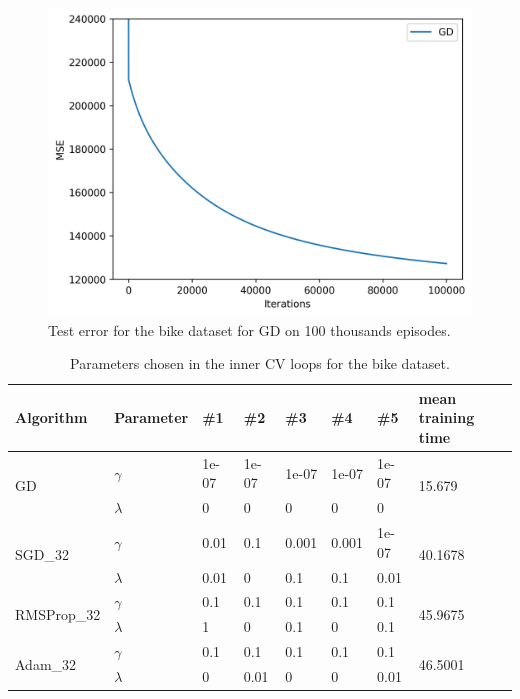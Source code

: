 \documentclass[10pt,conference,compsocconf]{IEEEtran}
\begin{document}
\begin{figure}[htbp]
	\centering
	\includegraphics[width=\columnwidth]{pictures/bike_test_GD_100k}
	\caption{Test error for the bike dataset for GD on 100 thousands episodes.}
	\vspace{-3mm}
	\label{fig:bike_test_GD_100k}
\end{figure}

\begin{table}[htbp]
	\centering
	\begin{tabular}[c]{llllllll}
		\hline
		Algorithm&Parameter&\#1&\#2&\#3&\#4&\#5&mean training time\\
		\hline
		\multirow{2}{*}{GD}&$\gamma$&1e-07&1e-07&1e-07&1e-07&1e-07&\multirow{2}{*}{15.679}\\
		&$\lambda$&0&0&0&0&0&\\
		
		\multirow{2}{*}{SGD\_32}&$\gamma$&0.01&0.1&0.001&0.001&1e-07&\multirow{2}{*}{40.1678}\\
		&$\lambda$&0.01&0&0.1&0.1&0.01&\\
		
		\multirow{2}{*}{RMSProp\_32}&$\gamma$&0.1&0.1&0.1&0.1&0.1&\multirow{2}{*}{45.9675}\\
		&$\lambda$&1&0&0.1&0&0.1&\\
		
		\multirow{2}{*}{Adam\_32}&$\gamma$&0.1&0.1&0.1&0.1&0.1&\multirow{2}{*}{46.5001}\\
		&$\lambda$&0&0.01&0&0&0.01&\\
		\hline
	\end{tabular}
	\caption{Parameters chosen in the inner CV loops for the bike dataset.}
	\label{tab:parameter_bike}
\end{table}
\end{document}
